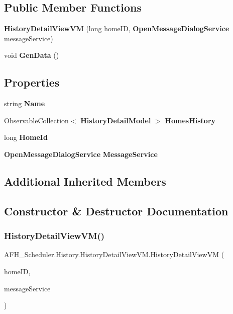 \subsection*{Public Member Functions}
\begin{DoxyCompactItemize}
\item 
\textbf{ History\+Detail\+View\+VM} (long home\+ID, \textbf{ Open\+Message\+Dialog\+Service} message\+Service)
\item 
void \textbf{ Gen\+Data} ()
\end{DoxyCompactItemize}
\subsection*{Properties}
\begin{DoxyCompactItemize}
\item 
string \textbf{ Name}\hspace{0.3cm}{\ttfamily  [get]}
\item 
Observable\+Collection$<$ \textbf{ History\+Detail\+Model} $>$ \textbf{ Homes\+History}\hspace{0.3cm}{\ttfamily  [get, set]}
\item 
long \textbf{ Home\+Id}\hspace{0.3cm}{\ttfamily  [get, set]}
\item 
\textbf{ Open\+Message\+Dialog\+Service} \textbf{ Message\+Service}\hspace{0.3cm}{\ttfamily  [get, set]}
\end{DoxyCompactItemize}
\subsection*{Additional Inherited Members}


\subsection{Constructor \& Destructor Documentation}
\mbox{\label{class_a_f_h___scheduler_1_1_history_1_1_history_detail_view_v_m_ae4d3b2b5774dad13c7faa12a9c7bcb38}} 
\subsubsection{HistoryDetailViewVM()}
{\footnotesize\ttfamily A\+F\+H\+\_\+\+Scheduler.\+History.\+History\+Detail\+View\+V\+M.\+History\+Detail\+View\+VM (\begin{DoxyParamCaption}\item[{long}]{home\+ID,  }\item[{\textbf{ Open\+Message\+Dialog\+Service}}]{message\+Service }\end{DoxyParamCaption})}



